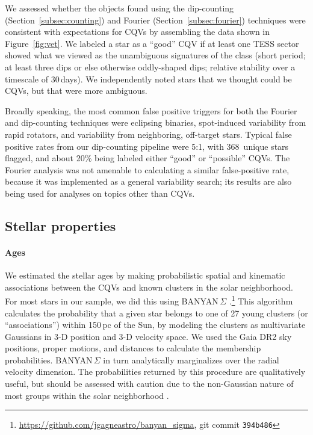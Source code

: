 \documentclass[11pt,twocolumn,tighten]{aastex63}
\newcommand{\nuniqdipflagged}{{368}} %
\begin{document}
We assessed whether the objects found using the dip-counting
(Section~\ref{subsec:counting}) and Fourier
(Section~\ref{subsec:fourier}) techniques were consistent with
expectations for CQVs by assembling the data shown in
Figure~\ref{fig:vet}.  We labeled a star as a ``good'' CQV if at least
one TESS sector showed what we viewed as the unambiguous signatures of
the class (short period; at least three dips or else otherwise
oddly-shaped dips; relative stability over a timescale of 30\,days).
We independently noted stars that we thought could be CQVs, but that
were more ambiguous.

Broadly speaking, the most common false positive triggers for both the Fourier
and dip-counting techniques were eclipsing binaries, spot-induced
variability from rapid rotators, and variability from neighboring,
off-target stars.  Typical false positive rates from our dip-counting
pipeline were 5:1, with \nuniqdipflagged\ unique stars flagged, and
about 20\% being labeled either ``good'' or ``possible'' CQVs.  The
Fourier analysis was not amenable to calculating a similar
false-positive rate, because it was implemented as a general
variability search; its results are also being used for analyses on
topics other than CQVs.


\subsection{Stellar properties}
\label{subsec:starprops}

\paragraph{Ages}
We estimated the stellar ages by making probabilistic spatial and
kinematic associations between the CQVs and known clusters in the
solar neighborhood.  For most stars in our sample, we did this using
BANYAN\,$\Sigma$
\citep{2018ApJ...856...23G}.\footnote{\url{https://github.com/jgagneastro/banyan_sigma},
git commit \texttt{394b486}} This algorithm calculates the probability
that a given star belongs to one of 27 young clusters (or
``associations'') within 150\,pc of the Sun, by modeling the clusters
as multivariate Gaussians in 3-D position and 3-D velocity space.  We
used the Gaia DR2 sky positions, proper motions, and distances to
calculate the membership probabilities.  BANYAN\,$\Sigma$ in turn
analytically marginalizes over the radial velocity dimension.  The
probabilities returned by this procedure are qualitatively useful, but
should be assessed with caution due to the non-Gaussian nature of most
groups within the solar neighborhood \citep[see
e.g.][Figure~10]{2021ApJ...917...23K}.
\end{document}
